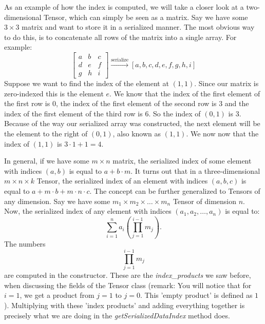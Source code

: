 \documentclass[12pt, titlepage]{article}
\begin{document}
    As an example of how the index is computed, we will take a closer look at a two-dimensional Tensor, which can simply be seen as a matrix. Say we have some $3\times 3$ matrix and want to store it in a serialized manner. The most obvious way to do this, is to concatenate all rows of the matrix into a single array. For example:
    \begin{equation*}
    \begin{bmatrix}
    a &b &c\\
    d &e &f\\
    g &h &i
    \end{bmatrix}\stackrel{\text{serialize}}{\longrightarrow} [a,b,c,d,e,f,g,h,i]
    \end{equation*}
    Suppose we want to find the index of the element at $(1,1)$. Since our matrix is zero-indexed this is the element $e$. We know that the index of the first element of the first row is $0$, the index of the first element of the second row is $3$ and the index of the first element of the third row is $6$. So the index of $(0,1)$ is $3$. Because of the way our serialized array was constructed, the next element will be the element to the right of $(0,1)$, also known as $(1,1)$. We now now that the index of $(1,1)$ is $3\cdot 1 + 1 = 4$.
    
    In general, if we have some $m\times n$ matrix, the serialized index of some element with indices $(a,b)$ is equal to $a+b\cdot m$. It turns out that in a three-dimensional $m\times n\times k$ Tensor, the serialized index of an element with indices $(a,b,c)$ is equal to $a+m\cdot b+m\cdot n\cdot c$. The concept can be further generalized to Tensors of any dimension. Say we have some $m_1\times m_2\times\ldots\times m_n$ Tensor of dimension $n$. Now, the serialized index of any element with indices $(a_1,a_2,\ldots,a_n)$ is equal to:
    \begin{equation*}
    \sum_{i=1}^{n}a_i\left(\prod_{j=1}^{i-1}m_j\right).
    \end{equation*}
    The numbers
    \begin{equation*}
    \prod_{j=1}^{i-1}m_j
    \end{equation*}
    are computed in the constructor. These are the \textit{index\_products} we saw before, when discussing the fields of the Tensor class (remark: You will notice that for $i=1$, we get a product from $j=1$ to $j=0$. This 'empty product' is defined as $1$). Multiplying with these 'index products' and adding everything together is precisely what we are doing in the \textit{getSerializedDataIndex} method does.
    
\end{document}
